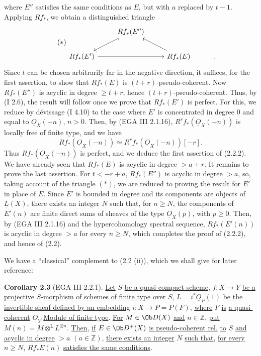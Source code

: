 where \(E''\) satisfies the same conditions as \(E\), but with \(a\) replaced by \(t-1\). Applying \(Rf_*\), we obtain a distinguished triangle
\begin{equation}\tag{$*$}
\begin{tikzcd}
& Rf_*(E'') \arrow[dl,hook] & \\
Rf_*(E') \arrow[rr] & & Rf_*(E) \arrow[ul] & .
\end{tikzcd}
\end{equation}
Since \(t\) can be chosen arbitrarily far in the negative direction, it suffices, for the first assertion, to show that \(Rf_*(E)\) is \((t+r)\)-pseudo-coherent. Now \(Rf_*(E'')\) is acyclic in degree \(\geq t+r\), hence \((t+r)\)-pseudo-coherent. Thus, by (I 2.6), the result will follow once we prove that \(Rf_*(E')\) is perfect. For this, we reduce by dévissage (I 4.10) to the case where \(E'\) is concentrated in degree \(0\) and equal to \(\underline{O}_X(-n)\), \(n>0\). Then, by (EGA III 2.1.16), \(R^rf_*(\underline{O}_X(-n))\) is locally free of finite type, and we have
\[
  Rf_*(\underline{O}_X(-n))\simeq R^rf_*(\underline{O}_X(-n))[-r].
\]
Thus \(Rf_*(\underline{O}_X(-n))\) is perfect, and we deduce the first assertion of (2.2.2). We have already seen that \(Rf_*(E)\) is acyclic in degree \(>a+r\). It remains to prove the last assertion. For \(t<-r+a\), \(Rf_*(E'')\) is acyclic in degree \(>a\), so, taking account of the triangle \((*)\), we are reduced to proving the result for \(E'\) in place of \(E\). Since \(E'\) is bounded in degree and its components are objects of \(\underline{L}(X)\), there exists an integer \(N\) such that, for \(n\geq N\), the components of \(E'(n)\) are finite direct sums of sheaves of the type \(\underline{O}_X(p)\), with \(p\geq0\). Then, by (EGA III 2.1.16) and the hypercohomology spectral sequence, \(Rf_*(E'(n))\) is acyclic in degree \(>a\) for every \(n\geq N\), which completes the proof of (2.2.2), and hence of (2.2).

We have a ``classical'' complement to (2.2 (ii)), which we shall give for later reference:

\textbf{Corollary 2.3} (EGA III 2.2.1). \uline{Let} \(S\) \uline{be a quasi-compact scheme}, \(f:X\to Y\) \uline{be a projective} \(S\)-\uline{morphism of schemes of finite type over} \(S\), \(L=i^*\underline{O}_P(1)\) \uline{be the invertible sheaf defined by an embedding} \(i:X\to P=P(F)\), \uline{where} \(F\) \uline{is} \uline{a quasi-coherent} \(\underline{O}_Y\)-\uline{Module of finite type}. \uline{For} \(M\in\Ob D(X)\) \uline{and} \(n\in\mathbb Z\), \uline{put} \(M(n)=M\otimes^{\mathrm L} L^{\otimes n}\). \uline{Then}, \uline{if} \(E\in\Ob D^+(X)\) \uline{is pseudo-coherent rel.} \uline{to} \(S\) \uline{and} \uline{acyclic in degree} \(>a\) \((a\in\mathbb Z)\), \uline{there exists an integer} \(N\) \uline{such that}, \uline{for every} \(n\geq N\), \(Rf_*E(n)\) \uline{satisfies the same conditions}.

